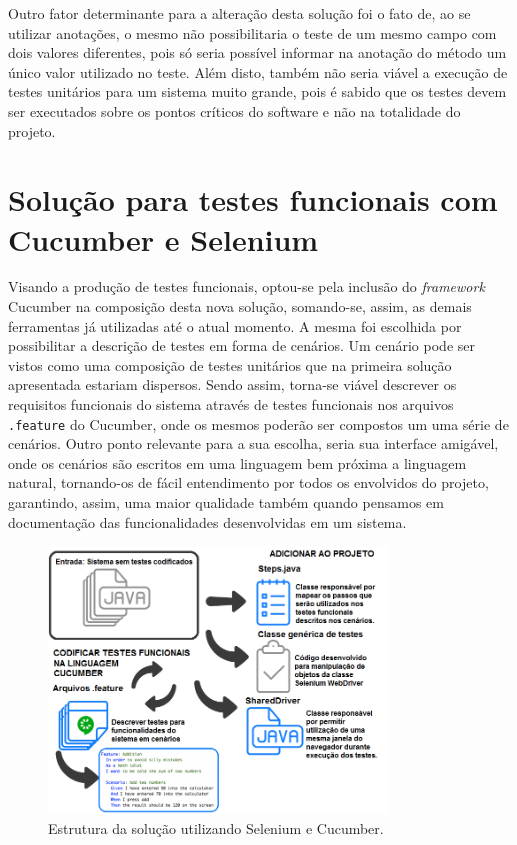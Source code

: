 \documentclass[tg]{mdtufsm}
\begin{document}
Outro fator determinante para a alteração desta solução foi o fato de, ao se utilizar anotações, o mesmo não possibilitaria o teste de um mesmo campo com dois valores diferentes, pois só seria possível informar na anotação do
método um único valor utilizado no teste. Além disto, também não seria viável a execução de testes unitários para um sistema muito grande, pois é sabido que os testes devem ser executados sobre os pontos críticos do software e não na totalidade do projeto.

\section{Solução para testes funcionais com Cucumber e Selenium}
Visando a produção de testes funcionais, optou-se pela inclusão do \emph{framework} Cucumber na composição desta nova solução, somando-se, assim, as demais ferramentas já utilizadas até o atual momento. A mesma foi escolhida por possibilitar a descrição de testes em forma de cenários. Um cenário pode ser vistos como uma composição de testes unitários que na primeira solução apresentada estariam dispersos. Sendo assim, torna-se viável descrever os requisitos funcionais do sistema através de testes funcionais nos arquivos \texttt{.feature} do Cucumber, onde os mesmos poderão ser compostos um uma série de cenários. Outro ponto relevante para a sua escolha, seria sua interface amigável, onde os cenários são escritos em uma linguagem bem próxima a linguagem natural, tornando-os de fácil entendimento por todos os envolvidos do projeto, garantindo, assim, uma maior qualidade também quando pensamos em documentação das funcionalidades desenvolvidas em um sistema.

\begin{figure}[!htb]
	\centering
	\includegraphics[width=0.8\textwidth]{solucao2}
	\caption{Estrutura da solução utilizando Selenium e Cucumber.}
	\label{fig:solucao2}
\end{figure}
\end{document}
